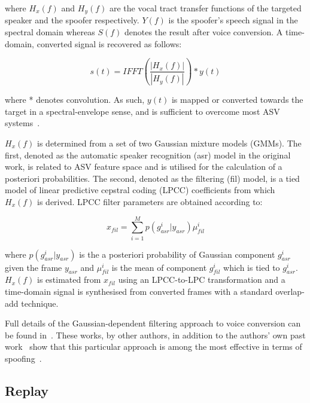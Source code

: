 \noindent where $H_{x}(f)$ and $H_{y}(f)$ are the vocal tract transfer functions of the targeted speaker and the spoofer respectively.  $Y(f)$ is the spoofer's speech signal in the spectral domain whereas $S(f)$ denotes the result after voice conversion. A time-domain, converted  signal is recovered as follows:

\begin{equation}
s(t) = IFFT(\frac{\left|H_{x}(f)\right|}{\left|H_{y}(f)\right|})*y(t)
\label{eq:conversioneq_t}
\end{equation}

\noindent where * denotes convolution. As such, $y(t)$ is mapped or converted towards the target in a spectral-envelope sense, and is sufficient to overcome most ASV systems~\cite{Matrouf2005, Bonastre2006}.

$H_x(f)$ is determined from a set of two Gaussian mixture models (GMMs).  The first, denoted as the automatic speaker recognition (asr) model in the original work, is related to ASV feature space and is utilised for the calculation of a posteriori probabilities.  The second, denoted as the filtering (fil) model, is a tied model of linear predictive cepstral coding (LPCC) coefficients from which $H_x(f)$ is derived.  LPCC filter parameters are obtained according to:

\begin{equation}
x_{fil} = \sum\limits_{i=1}^{M}p(g_{asr}^{i}|y_{asr}) \mu_{fil}^{i}
\label{eq:EMit}
\end{equation}

\noindent where $p(g_{asr}^{i}|y_{asr})$ is the a posteriori probability of Gaussian component $g_{asr}^{i}$ given the frame $y_{asr}$ and $\mu_{fil}^{i}$ is the mean of component $g_{fil}^{i}$ which is tied to $g_{asr}^{i}$.  $H_{x}(f)$ is estimated from $x_{fil}$ using an LPCC-to-LPC transformation and a time-domain signal is synthesised from converted frames with a standard overlap-add technique.  

Full details of the Gaussian-dependent filtering approach to voice conversion can be found in~\cite{Matrouf2005, Bonastre2006, Bonastre2007}.  These works, by other authors, in addition to the authors' own past work~\cite{Alegre2012a,Alegre2013,Alegre2013a} show that this particular approach is among the most effective in terms of spoofing~\cite{Wu2014a}.



\subsection{Replay}
\label{ssec:replay}

